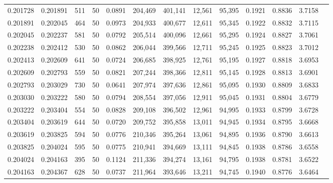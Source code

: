 \begin{tabular}{rrrrrrrrrrrrr}
0.201728 & 0.201891 &   511 &  50 &                                     0.0891 & 204,469 & 401,141 &  12,561 &  95,395 & 0.1921 & 0.8836 & 3.7158 \\
0.201891 & 0.202045 &   464 &  50 &                                     0.0973 & 204,933 & 400,677 &  12,611 &  95,345 & 0.1922 & 0.8832 & 3.7115 \\
0.202045 & 0.202237 &   581 &  50 &                                     0.0792 & 205,514 & 400,096 &  12,661 &  95,295 & 0.1924 & 0.8827 & 3.7061 \\
0.202238 & 0.202412 &   530 &  50 &                                     0.0862 & 206,044 & 399,566 &  12,711 &  95,245 & 0.1925 & 0.8823 & 3.7012 \\
0.202413 & 0.202609 &   641 &  50 &                                     0.0724 & 206,685 & 398,925 &  12,761 &  95,195 & 0.1927 & 0.8818 & 3.6953 \\
0.202609 & 0.202793 &   559 &  50 &                                     0.0821 & 207,244 & 398,366 &  12,811 &  95,145 & 0.1928 & 0.8813 & 3.6901 \\
0.202793 & 0.203029 &   730 &  50 &                                     0.0641 & 207,974 & 397,636 &  12,861 &  95,095 & 0.1930 & 0.8809 & 3.6833 \\
0.203030 & 0.203222 &   580 &  50 &                                     0.0794 & 208,554 & 397,056 &  12,911 &  95,045 & 0.1931 & 0.8804 & 3.6779 \\
0.203222 & 0.203404 &   554 &  50 &                                     0.0828 & 209,108 & 396,502 &  12,961 &  94,995 & 0.1933 & 0.8799 & 3.6728 \\
0.203404 & 0.203619 &   644 &  50 &                                     0.0720 & 209,752 & 395,858 &  13,011 &  94,945 & 0.1934 & 0.8795 & 3.6668 \\
0.203619 & 0.203825 &   594 &  50 &                                     0.0776 & 210,346 & 395,264 &  13,061 &  94,895 & 0.1936 & 0.8790 & 3.6613 \\
0.203825 & 0.204024 &   595 &  50 &                                     0.0775 & 210,941 & 394,669 &  13,111 &  94,845 & 0.1938 & 0.8786 & 3.6558 \\
0.204024 & 0.204163 &   395 &  50 &                                     0.1124 & 211,336 & 394,274 &  13,161 &  94,795 & 0.1938 & 0.8781 & 3.6522 \\
0.204163 & 0.204367 &   628 &  50 &                                     0.0737 & 211,964 & 393,646 &  13,211 &  94,745 & 0.1940 & 0.8776 & 3.6464 \\

\end{tabular}
